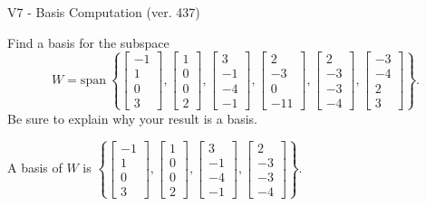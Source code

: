 \begin{exercise}
  \begin{exerciseTitle}V7 - Basis Computation (ver. 437)\end{exerciseTitle}
  \begin{exerciseStatement}
    Find a basis for the subspace 
\[W=\mathrm{span}\ \left\{\left[\begin{array}{r}
-1 \\
1 \\
0 \\
3
\end{array}\right] , \left[\begin{array}{r}
1 \\
0 \\
0 \\
2
\end{array}\right] , \left[\begin{array}{r}
3 \\
-1 \\
-4 \\
-1
\end{array}\right] , \left[\begin{array}{r}
2 \\
-3 \\
0 \\
-11
\end{array}\right] , \left[\begin{array}{r}
2 \\
-3 \\
-3 \\
-4
\end{array}\right] , \left[\begin{array}{r}
-3 \\
-4 \\
2 \\
3
\end{array}\right]\right\}.\]
 Be sure to explain why your result is a basis.


  \end{exerciseStatement}
  \begin{exerciseAnswer}
   A basis of \(W\) is  \(\left\{\left[\begin{array}{r}
-1 \\
1 \\
0 \\
3
\end{array}\right] , \left[\begin{array}{r}
1 \\
0 \\
0 \\
2
\end{array}\right] , \left[\begin{array}{r}
3 \\
-1 \\
-4 \\
-1
\end{array}\right] , \left[\begin{array}{r}
2 \\
-3 \\
-3 \\
-4
\end{array}\right]\right\}\).
  


  \end{exerciseAnswer}
\end{exercise}